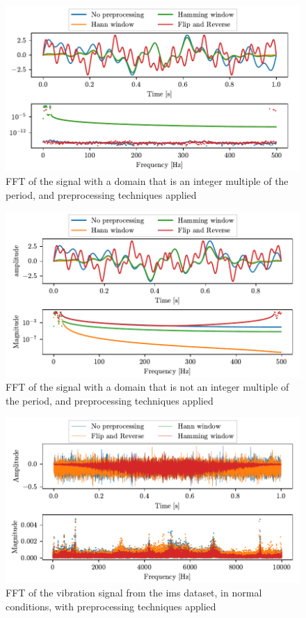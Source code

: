\begin{figure}
    \centering
    \includegraphics[scale=1]{images/FeatureExtraction/FD_Preproc_sync.pdf}
    \caption{FFT of the signal  with a domain that is an integer multiple of the period, and preprocessing techniques applied}
    \label{fig:FD_preprocessing}
\end{figure}

\begin{figure}
    \centering
    \includegraphics[scale=1]{images/FeatureExtraction/FD_Preproc_outofsync.pdf}
    \caption{FFT of the signal with a domain that is not an integer multiple of the period, and preprocessing techniques applied}
    \label{fig:FD_preprocessing_dist}
\end{figure}

\begin{figure}
    \centering
    \includegraphics[scale=1]{images/FeatureExtraction/FD_PreprocIMS.pdf}
    \caption{FFT of the  vibration signal from the \gls{ims} dataset, in normal conditions, with preprocessing techniques applied}
    \label{fig:IMS}
\end{figure}


